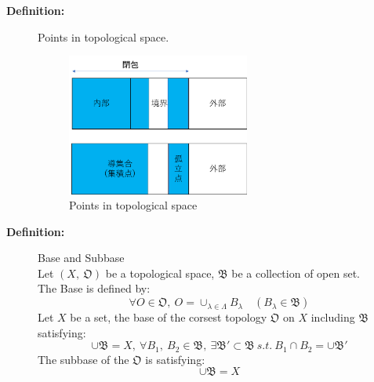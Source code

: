 \documentclass[english,dvipdfmx]{jsarticle}
\begin{document}
\begin{description}
    \item[\bf{Definition:}] Points in topological space.
        \begin{figure}[H]
            \begin{center}
                \includegraphics[clip,width=6cm]{./interior.png}
                \caption{Points in topological space}
            \end{center}
        \end{figure}
    
    \item[\bf{Definition:}] Base and Subbase \\
        Let $( X,\ \mathfrak{O})$ be a topological space, $\mathfrak{B}$ be a collection of open set.\\
        The Base is defined by:
            $$\forall O \in \mathfrak{O},\ O = \cup_{\lambda \in \Lambda} B_{\lambda} \quad (B_{\lambda} \in \mathfrak{B}) $$
        Let $X$ be a set, the base of the corsest topology $\mathfrak{O}$ on $X$ including $\mathfrak{B}$ satisfying:
            $$\cup \mathfrak{B} = X,\ \forall B_1,\ B_2 \in \mathfrak{B},\ \exists \mathfrak{B}' \subset \mathfrak{B} \ s.t. \ B_1 \cap B_2 = \cup \mathfrak{B}'$$
        The subbase of the $\mathfrak{O}$ is satisfying:
            $$\cup \mathfrak{B} = X$$

            
        



\end{description}
\end{document}
